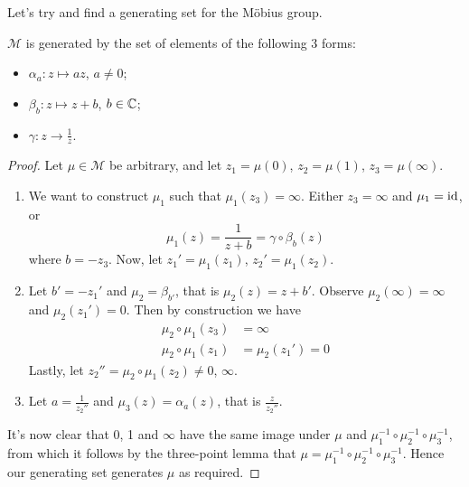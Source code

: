 \documentclass{../../template/note}
\begin{document}

    Let's try and find a generating set for the M\"obius group.
    
    \begin{proposition}
        \(\mathcal M\) is generated by the set of elements of the following 3 forms:
        \begin{itemize}
            \item \(\alpha_a: z \mapsto az\), \(a \neq 0\);
            \item \(\beta_b: z \mapsto z + b\), \(b \in \mathbb C\);
            \item \(\gamma: z \to \frac{1}{z}\).
        \end{itemize}
        \label{generators-mobius-group}
    \end{proposition}
    
    \begin{proof}
        Let \(\mu \in \mathcal M\) be arbitrary, and let \(z_1 = \mu(0)\), \(z_2 = \mu(1)\), \(z_3 = \mu(\infty)\).
        \begin{enumerate}[label=\protect\circled{\arabic*}]
            \item We want to construct \(\mu_1\) such that \(\mu_1(z_3) = \infty\). Either \(z_3 = \infty\) and \(\mu_1 = \operatorname{id}\), or
            \[
                \mu_1(z) = \frac{1}{z+b} = \gamma \circ \beta_b(z)
            \]
            where \(b = -z_3\). Now, let \(z_1' = \mu_1(z_1)\), \(z_2' = \mu_1(z_2)\).
            \item Let \(b' = -z_1'\) and \(\mu_2 = \beta_{b'}\), that is \(\mu_2(z) = z + b'\). Observe \(\mu_2(\infty) = \infty\) and \(\mu_2(z_1') = 0\). Then by construction we have
            \begin{align*}
                \mu_2 \circ \mu_1 (z_3) &= \infty \\
                \mu_2 \circ \mu_1 (z_1) &= \mu_2(z_1') = 0
            \end{align*}
            Lastly, let \(z_2'' = \mu_2 \circ \mu_1(z_2) \neq 0\), \(\infty\).
            \item Let \(a = \frac{1}{z_2''}\) and \(\mu_3(z) = \alpha_a(z)\), that is \(\frac{z}{z_2''}\).
        \end{enumerate}
        It's now clear that 0, 1 and \(\infty\) have the same image under \(\mu\) and \(\mu_1^{-1} \circ \mu_2^{-1} \circ \mu_3^{-1}\), from which it follows by the three-point lemma that \(\mu = \mu_1^{-1} \circ \mu_2^{-1} \circ \mu_3^{-1}\). Hence our generating set generates \(\mu\) as required.
    \end{proof}
    
\end{document}
